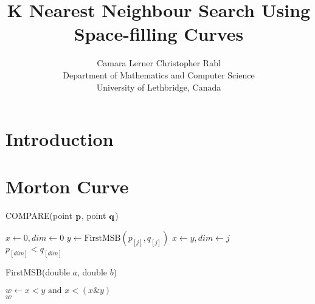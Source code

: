 \documentclass[10pt]{article}
\begin{document}
\title{K Nearest Neighbour Search Using Space-filling Curves}
\author{Camara Lerner \hspace{2cm} Christopher Rabl \\
  Department of Mathematics and Computer Science \\
  University of Lethbridge, Canada}

\maketitle

\section{Introduction}

\section{Morton Curve}

\begin{algorithm}
  \caption{COMPARE(point ${\bf p}$, point ${\bf q}$)}
  \label{compare}
  \begin{algorithmic}[1]
    \State $x \leftarrow 0, dim \leftarrow 0$
    \State $y \leftarrow \text{FirstMSB}(p_{[j]}, q_{[j]})$
    \State $x \leftarrow y, dim \leftarrow j$
    \EndIf 
    \EndFor \\
    \Return $p_{[dim]} < q_{[dim]}$
  \end{algorithmic}
\end{algorithm}

\begin{algorithm}
  \caption{FirstMSB(double $a$, double $b$)}
  \label{first-msb}
  \begin{algorithmic}[1]
    \State $w \leftarrow x < y \text{ and } x < (x \mathrel{\&} y)$ \\
    \Return $w$
  \end{algorithmic}
\end{algorithm}
\end{document}
